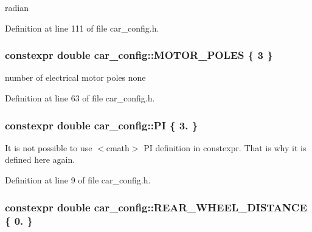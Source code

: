 radian 



Definition at line 111 of file car\+\_\+config.\+h.

\subsubsection[{\texorpdfstring{M\+O\+T\+O\+R\+\_\+\+P\+O\+L\+ES}{MOTOR_POLES}}]{\setlength{\rightskip}{0pt plus 5cm}constexpr double car\+\_\+config\+::\+M\+O\+T\+O\+R\+\_\+\+P\+O\+L\+ES \{ 3 \}}\hypertarget{namespacecar__config_a611a0f02cf52db1d438a2dd53b642cd5}{}\label{namespacecar__config_a611a0f02cf52db1d438a2dd53b642cd5}


number of electrical motor poles  none 



Definition at line 63 of file car\+\_\+config.\+h.

\subsubsection[{\texorpdfstring{PI}{PI}}]{\setlength{\rightskip}{0pt plus 5cm}constexpr double car\+\_\+config\+::\+PI \{ 3. \}}\hypertarget{namespacecar__config_a90cb9957197db8924811c447bc98703a}{}\label{namespacecar__config_a90cb9957197db8924811c447bc98703a}


It is not possible to use $<$cmath$>$ PI definition in constexpr. That is why it is defined here again. 



Definition at line 9 of file car\+\_\+config.\+h.

\subsubsection[{\texorpdfstring{R\+E\+A\+R\+\_\+\+W\+H\+E\+E\+L\+\_\+\+D\+I\+S\+T\+A\+N\+CE}{REAR_WHEEL_DISTANCE}}]{\setlength{\rightskip}{0pt plus 5cm}constexpr double car\+\_\+config\+::\+R\+E\+A\+R\+\_\+\+W\+H\+E\+E\+L\+\_\+\+D\+I\+S\+T\+A\+N\+CE \{ 0. \}}\hypertarget{namespacecar__config_a43e668702c6dc662ff95f80047ee5500}{}\label{namespacecar__config_a43e668702c6dc662ff95f80047ee5500}



